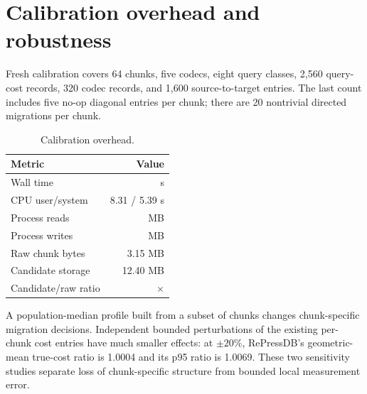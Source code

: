 \documentclass[preprint,12pt,authoryear]{elsarticle}
\begin{document}
\section{Calibration overhead and robustness}

Fresh calibration covers 64 chunks, five codecs, eight query classes, 2,560 query-cost records, 320 codec records, and 1,600 source-to-target entries. The last count includes five no-op diagonal entries per chunk; there are 20 nontrivial directed migrations per chunk.

\begin{table}[H]
\centering
\caption{Calibration overhead.}
\begin{tabular}{@{}lr@{}}
\toprule
Metric & Value \\
\midrule
Wall time & \CalibrationSeconds{} s \\
CPU user/system & 8.31 / 5.39 s \\
Process reads & \CalibrationReadMB{} MB \\
Process writes & \CalibrationWriteMB{} MB \\
Raw chunk bytes & 3.15 MB \\
Candidate storage & 12.40 MB \\
Candidate/raw ratio & \CalibrationCandidateRatio{}$\times$ \\
\bottomrule
\end{tabular}
\end{table}

\begin{table}[H]
\centering
\caption{Sampled-profile evaluation.}
\end{table}

A population-median profile built from a subset of chunks changes chunk-specific migration decisions. Independent bounded perturbations of the existing per-chunk cost entries have much smaller effects: at $\pm20\%$, RePressDB's geometric-mean true-cost ratio is 1.0004 and its p95 ratio is 1.0069. These two sensitivity studies separate loss of chunk-specific structure from bounded local measurement error.
\end{document}
